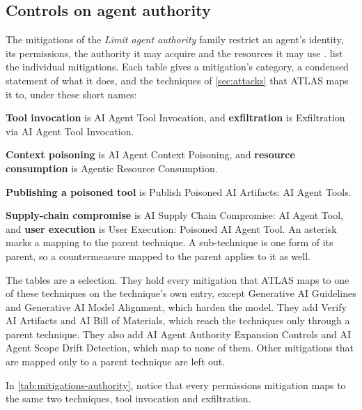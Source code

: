 \subsection{Controls on agent authority}
\label{sec:mitigations-authority}

The mitigations of the \emph{Limit agent authority} family restrict an agent's identity, its
permissions, the authority it may acquire and the resources it may use \citep{mitre-atlas-2026}.
 list the
individual mitigations. Each table gives a mitigation's category, a condensed statement of what it
does, and the techniques of \cref{sec:attacks} that ATLAS maps it to, under these short names:
\bi
\item \textbf{Tool invocation} is AI Agent Tool Invocation, and \textbf{exfiltration} is
Exfiltration via AI Agent Tool Invocation.
\item \textbf{Context poisoning} is AI Agent Context Poisoning, and \textbf{resource consumption}
is Agentic Resource Consumption.
\item \textbf{Publishing a poisoned tool} is Publish Poisoned AI Artifacts: AI Agent Tools.
\item \textbf{Supply-chain compromise} is AI Supply Chain Compromise: AI Agent Tool, and
\textbf{user execution} is User Execution: Poisoned AI Agent Tool.
\ei
An asterisk marks a mapping to the parent technique. A sub-technique is one form of its parent, so
a countermeasure mapped to the parent applies to it as well.

The tables are a selection. They hold every mitigation that ATLAS maps to one of these techniques on
the technique's own entry, except Generative AI Guidelines and Generative AI Model Alignment, which
harden the model. They add Verify AI Artifacts and AI Bill of Materials, which reach the techniques
only through a parent technique. They also add AI Agent Authority Expansion Controls and AI Agent
Scope Drift Detection, which map to none of them. Other mitigations that are mapped only to a
parent technique are left out.

In \cref{tab:mitigations-authority}, notice that every permissions mitigation maps to the same two
techniques, tool invocation and exfiltration.

